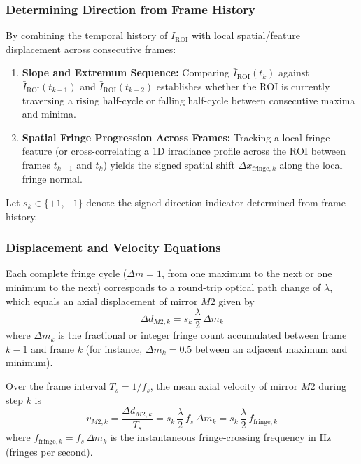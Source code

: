 \subsubsection{Determining Direction from Frame History}
By combining the temporal history of $\bar{I}_{\text{ROI}}$ with local spatial/feature displacement across consecutive frames:
\begin{enumerate}
    \item \textbf{Slope and Extremum Sequence:} Comparing $\bar{I}_{\text{ROI}}(t_k)$ against $\bar{I}_{\text{ROI}}(t_{k-1})$ and $\bar{I}_{\text{ROI}}(t_{k-2})$ establishes whether the $\text{ROI}$ is currently traversing a rising half-cycle or falling half-cycle between consecutive maxima and minima.
    \item \textbf{Spatial Fringe Progression Across Frames:} Tracking a local fringe feature (or cross-correlating a 1D irradiance profile across the $\text{ROI}$ between frames $t_{k-1}$ and $t_k$) yields the signed spatial shift $\Delta x_{\text{fringe}, k}$ along the local fringe normal.
\end{enumerate}
Let $s_k \in \{+1, -1\}$ denote the signed direction indicator determined from frame history.

\subsubsection{Displacement and Velocity Equations}
Each complete fringe cycle ($\Delta m = 1$, from one maximum to the next or one minimum to the next) corresponds to a round-trip optical path change of $\lambda$, which equals an axial displacement of mirror $M2$ given by
\begin{equation}
    \Delta d_{M2, k} = s_k\,\frac{\lambda}{2}\,\Delta m_k
    \label{eq:roi_step_displacement}
\end{equation}
where $\Delta m_k$ is the fractional or integer fringe count accumulated between frame $k-1$ and frame $k$ (for instance, $\Delta m_k = 0.5$ between an adjacent maximum and minimum).

Over the frame interval $T_s = 1/f_s$, the mean axial velocity of mirror $M2$ during step $k$ is
\begin{equation}
    v_{M2, k} = \frac{\Delta d_{M2, k}}{T_s} = s_k\,\frac{\lambda}{2}\,f_s\,\Delta m_k = s_k\,\frac{\lambda}{2}\,f_{\text{fringe}, k}
    \label{eq:roi_step_velocity}
\end{equation}
where $f_{\text{fringe}, k} = f_s\,\Delta m_k$ is the instantaneous fringe-crossing frequency in $\text{Hz}$ (fringes per second).


